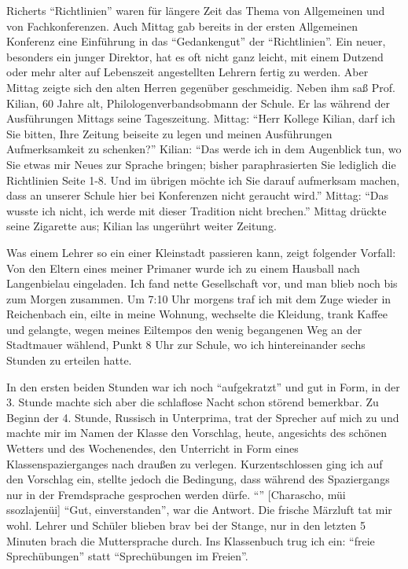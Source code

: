 Richerts \enquote{Richtlinien} waren für längere Zeit das Thema von Allgemeinen und von Fachkonferenzen. Auch Mittag gab bereits in der ersten Allgemeinen Konferenz eine Einführung in das \enquote{Gedankengut} der \enquote{Richtlinien}. Ein neuer, besonders ein junger Direktor, hat es oft nicht ganz leicht, mit einem Dutzend oder mehr alter auf Lebenszeit angestellten Lehrern fertig zu werden. Aber Mittag zeigte sich den alten Herren gegenüber geschmeidig. Neben ihm saß Prof. Kilian, 60 Jahre alt, Philologenverbandsobmann der Schule. Er las während der Ausführungen Mittags seine Tageszeitung. Mittag: \enquote{Herr Kollege Kilian, darf ich Sie bitten, Ihre Zeitung beiseite zu legen und meinen Ausführungen Aufmerksamkeit zu schenken?} Kilian: \enquote{Das werde ich in dem Augenblick tun, wo Sie etwas mir Neues zur Sprache bringen; bisher paraphrasierten Sie lediglich die Richtlinien Seite 1-8. Und im übrigen möchte ich Sie darauf aufmerksam machen, dass an unserer Schule hier bei Konferenzen nicht geraucht wird.} Mittag: \enquote{Das wusste ich nicht, ich werde mit dieser Tradition nicht brechen.} Mittag drückte seine Zigarette aus; Kilian las ungerührt weiter Zeitung.

Was einem Lehrer so ein einer Kleinstadt passieren kann, zeigt folgender Vorfall: Von den Eltern eines meiner Primaner wurde ich zu einem Hausball nach Langenbielau eingeladen. Ich fand nette Gesellschaft vor, und man blieb noch bis zum Morgen zusammen. Um 7:10 Uhr morgens traf ich mit dem Zuge wieder in Reichenbach ein, eilte in meine Wohnung, wechselte die Kleidung, trank Kaffee und gelangte, wegen meines Eiltempos den wenig begangenen Weg an der Stadtmauer wählend, Punkt 8 Uhr zur Schule, wo ich hintereinander sechs Stunden zu erteilen hatte.

In den ersten beiden Stunden war ich noch \enquote{aufgekratzt} und gut in Form, in der 3. Stunde machte sich aber die schlaflose Nacht schon störend bemerkbar. Zu Beginn der 4. Stunde, Russisch in Unterprima, trat der Sprecher auf mich zu und machte mir im Namen der Klasse den Vorschlag, heute, angesichts des schönen Wetters und des Wochenendes, den Unterricht in Form eines Klassenspazierganges nach draußen zu verlegen. Kurzentschlossen ging ich auf den Vorschlag ein, stellte jedoch die Bedingung, dass während des Spaziergangs nur in der Fremdsprache gesprochen werden dürfe. \enquote{} [Charascho, müi ssozlajenüi] \enquote{Gut, einverstanden}, war die Antwort. Die frische Märzluft tat mir wohl. Lehrer und Schüler blieben brav bei der Stange, nur in den letzten 5 Minuten brach die Muttersprache durch. Ins Klassenbuch trug ich ein: \enquote{freie Sprechübungen} statt \enquote{Sprechübungen im Freien}.

